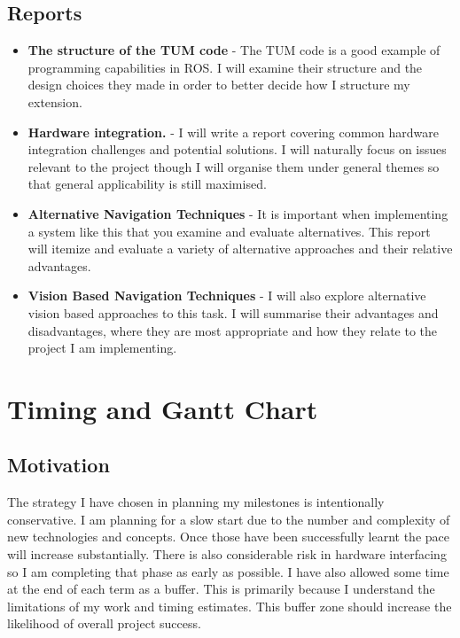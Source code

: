 \documentclass[]{../resources/final_report}
\begin{document}
\subsection{Reports}
\begin{itemize}
  \item \textbf{The structure of the TUM code} - The TUM code is a good example of programming capabilities in ROS. I will examine their structure and the design choices they made in order to better decide how I structure my extension.
  \item \textbf{Hardware integration.} - I will write a report covering common hardware integration challenges and potential solutions. I will naturally focus on issues relevant to the project though I will organise them under general themes so that general applicability is still maximised.

  \item \textbf{Alternative Navigation Techniques} - It is important when implementing a system like this that you examine and evaluate alternatives. This report will itemize and evaluate a variety of alternative approaches and their relative advantages.
  \item \textbf{Vision Based Navigation Techniques} - I will also explore alternative vision based approaches to this task. I will summarise their advantages and disadvantages, where they are most appropriate and how they relate to the project I am implementing.
\end{itemize}

\newpage

\section{Timing and Gantt Chart}

\subsection{Motivation}

The strategy I have chosen in planning my milestones is intentionally conservative.
I am \linebreak planning for a slow start due to the number and complexity of new technologies and concepts. Once those have been successfully learnt the pace will increase substantially.
There is also considerable risk in hardware interfacing so I am completing that phase as early as possible.
\linebreak
\linebreak
I have also allowed some time at the end of each term as a buffer. This is primarily because I understand the limitations of my work and timing estimates. This buffer zone should increase the likelihood of overall project success.
\vspace{20pt}
\end{document}
